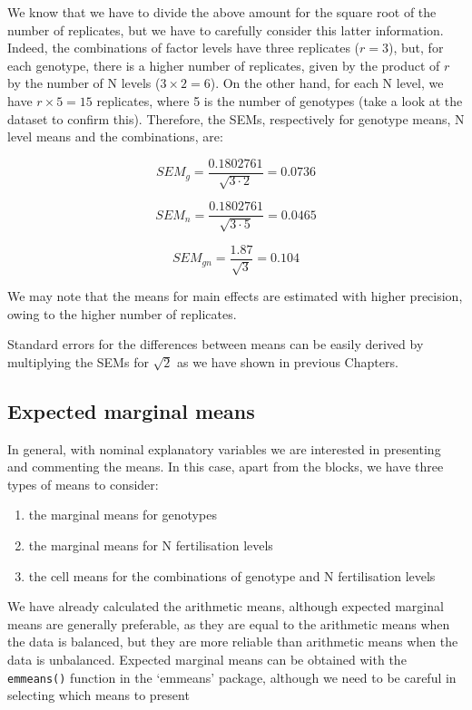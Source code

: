 \documentclass[a4paper,12pt,oneside]{book}
\providecommand{\tightlist}{%
  \setlength{\itemsep}{0pt}\setlength{\parskip}{0pt}}
\begin{document}
We know that we have to divide the above amount for the square root of the number of replicates, but we have to carefully consider this latter information. Indeed, the combinations of factor levels have three replicates (\(r = 3\)), but, for each genotype, there is a higher number of replicates, given by the product of \(r\) by the number of N levels (\(3 \times 2 = 6\)). On the other hand, for each N level, we have \(r \times 5 = 15\) replicates, where 5 is the number of genotypes (take a look at the dataset to confirm this). Therefore, the SEMs, respectively for genotype means, N level means and the combinations, are:

\[SEM_g = \frac{0.1802761}{\sqrt{3 \cdot 2}} = 0.0736\]

\[SEM_n = \frac{0.1802761}{\sqrt{3 \cdot 5}} = 0.0465\]

\[SEM_{gn} = \frac{1.87}{\sqrt{3}} = 0.104\]

We may note that the means for main effects are estimated with higher precision, owing to the higher number of replicates.

Standard errors for the differences between means can be easily derived by multiplying the SEMs for \(\sqrt{2}\) as we have shown in previous Chapters.

\hypertarget{expected-marginal-means-1}{%
\subsection{Expected marginal means}\label{expected-marginal-means-1}}

In general, with nominal explanatory variables we are interested in presenting and commenting the means. In this case, apart from the blocks, we have three types of means to consider:

\begin{enumerate}
\def\labelenumi{\arabic{enumi}.}
\tightlist
\item
  the marginal means for genotypes
\item
  the marginal means for N fertilisation levels
\item
  the cell means for the combinations of genotype and N fertilisation levels
\end{enumerate}

We have already calculated the arithmetic means, although expected marginal means are generally preferable, as they are equal to the arithmetic means when the data is balanced, but they are more reliable than arithmetic means when the data is unbalanced. Expected marginal means can be obtained with the \texttt{emmeans()} function in the `emmeans' package, although we need to be careful in selecting which means to present
\end{document}
